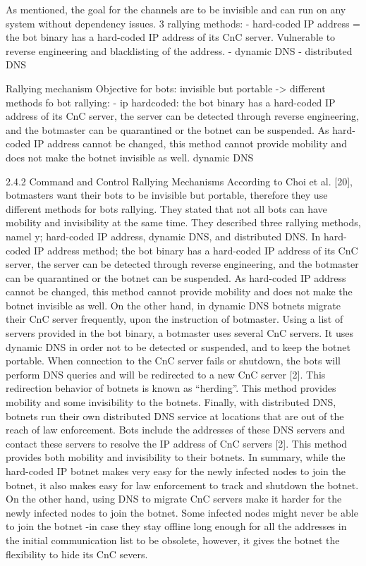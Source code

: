 As mentioned, the goal for the channels are to be invisible and can run on any system without dependency issues.
3 rallying methods: 
- hard-coded IP address = the bot binary has a hard-coded IP address of its CnC server. Vulnerable to reverse engineering and blacklisting of the address.
- dynamic DNS
- distributed DNS

Rallying mechanism 
Objective for bots: invisible but portable -> different methods fo bot rallying: - ip hardcoded: the bot binary has a hard-coded IP address of its CnC server, the server can be detected through reverse engineering, and the botmaster can be quarantined or the botnet can be suspended. As hard-coded IP address cannot be changed, this method cannot provide mobility and does not make the botnet
invisible as well. dynamic DNS

2.4.2 Command and Control Rallying Mechanisms 
According to Choi et al. [20], botmasters want their bots to be invisible but portable, therefore they use different methods for bots rallying. They stated that not all bots can have mobility and invisibility at the same time. They described three rallying methods, namel y; hard-coded IP address, dynamic DNS, and distributed DNS. In hard-coded IP address method; the bot binary has a hard-coded IP address of its CnC server, the server can be detected through reverse engineering, and the botmaster can be quarantined or the botnet can be suspended. As hard-coded IP address cannot be changed, this method cannot provide mobility and does not make the botnet invisible as well. On the other hand, in dynamic DNS botnets migrate their CnC server frequently, upon the instruction of botmaster. Using a list of servers provided in the bot binary, a botmaster uses several CnC servers. It uses dynamic DNS in order not to be detected or suspended, and to keep the botnet portable. When connection to the CnC server fails or shutdown, the bots will perform DNS queries and will be redirected to a new CnC server [2]. This redirection behavior of botnets is known as “herding”. This method provides mobility and some invisibility to the botnets. Finally, with distributed DNS, botnets run their own distributed DNS service at locations that are out of the reach of law enforcement. Bots include the addresses of these DNS servers and contact these servers to resolve the IP address of CnC servers [2]. This method provides both mobility and invisibility to their botnets. In summary, while the hard-coded IP botnet makes very easy for the newly infected nodes to join the botnet, it also makes easy for law enforcement to track and shutdown the botnet. On the other hand, using DNS to migrate CnC servers make it harder for the newly infected nodes to join the botnet. Some infected nodes might never be able to join the botnet -in case they stay offline long enough for all the addresses in the initial communication list to be obsolete, however, it gives the botnet the flexibility to hide its CnC severs. 



